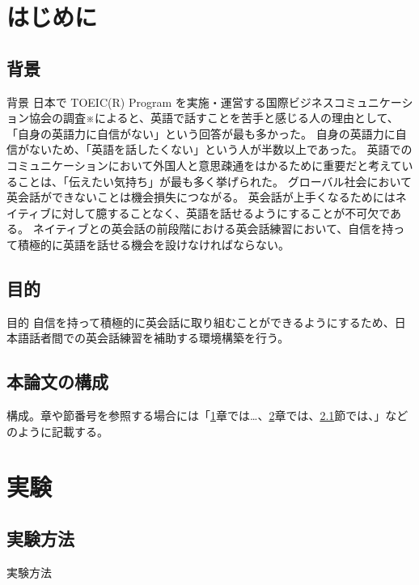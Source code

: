 \documentclass[12pt,dvipdfmx]{jreport}
\begin{document}
\tableofcontents %
\listoffigures %
\listoftables %


\chapter{はじめに} \label{chap:intro}
\setcounter{page}{1}   %

 \section{背景}
 背景
 日本で TOEIC(R) Program を実施・運営する国際ビジネスコミュニケーション協会の調査※によると、英語で話すことを苦手と感じる人の理由として、「自身の英語力に自信がない」という回答が最も多かった。
自身の英語力に自信がないため、「英語を話したくない」という人が半数以上であった。
英語でのコミュニケーションにおいて外国人と意思疎通をはかるために重要だと考えていることは、「伝えたい気持ち」が最も多く挙げられた。
グローバル社会において英会話ができないことは機会損失につながる。
英会話が上手くなるためにはネイティブに対して臆することなく、英語を話せるようにすることが不可欠である。
ネイティブとの英会話の前段階における英会話練習において、自信を持って積極的に英語を話せる機会を設けなければならない。



 \section{目的}
 目的
 自信を持って積極的に英会話に取り組むことができるようにするため、日本語話者間での英会話練習を補助する環境構築を行う。


 \section{本論文の構成}
 構成。章や節番号を参照する場合には「\ref{chap:intro}章では…、\ref{chap:exp}章では、\ref{sec:method}節では、」などのように記載する。


\chapter{実験} \label{chap:exp}
 \section{実験方法} \label{sec:method}
 実験方法
\end{document}
